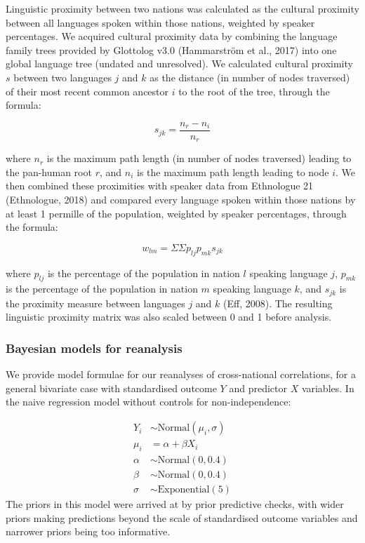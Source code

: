 \documentclass[
  man,floatsintext]{apa6}
\begin{document}
Linguistic proximity between two nations was calculated as the cultural proximity between all languages spoken within those nations, weighted by speaker percentages. We acquired cultural proximity data by combining the language family trees provided by Glottolog v3.0 (Hammarström et al., 2017) into one global language tree (undated and unresolved). We calculated cultural proximity \(s\) between two languages \(j\) and \(k\) as the distance (in number of nodes traversed) of their most recent common ancestor \(i\) to the root of the tree, through the formula:

\[
s_{jk} = \frac{n_{r}-n_{i}}{n_{r}}
\]

where \(n_{r}\) is the maximum path length (in number of nodes traversed) leading to the pan-human root \(r\), and \(n_{i}\) is the maximum path length leading to node \(i\). We then combined these proximities with speaker data from Ethnologue 21 (Ethnologue, 2018) and compared every language spoken within those nations by at least 1 permille of the population, weighted by speaker percentages, through the formula:

\[
w_{lm} = {\Sigma}{\Sigma}p_{lj}p_{mk}s_{jk}
\]

where \(p_{lj}\) is the percentage of the population in nation \(l\) speaking language \(j\), \(p_{mk}\) is the percentage of the population in nation \(m\) speaking language \(k\), and \(s_{jk}\) is the proximity measure between languages \(j\) and \(k\) (Eff, 2008). The resulting linguistic proximity matrix was also scaled between 0 and 1 before analysis.

\hypertarget{bayesian-models-for-reanalysis}{%
\subsubsection{Bayesian models for reanalysis}\label{bayesian-models-for-reanalysis}}

We provide model formulae for our reanalyses of cross-national correlations, for a general bivariate case with standardised outcome \(Y\) and predictor \(X\) variables. In the naive regression model without controls for non-independence:

\[
\begin{aligned}
Y_{i} &\sim \text{Normal}(\mu_{i},\sigma) \\
\mu_{i} &= \alpha + \beta X_{i} \\
\alpha &\sim \text{Normal}(0, 0.4) \\
\beta &\sim \text{Normal}(0, 0.4) \\
\sigma &\sim \text{Exponential}(5)
\end{aligned}
\]
The priors in this model were arrived at by prior predictive checks, with wider priors making predictions beyond the scale of standardised outcome variables and narrower priors being too informative.
\end{document}
